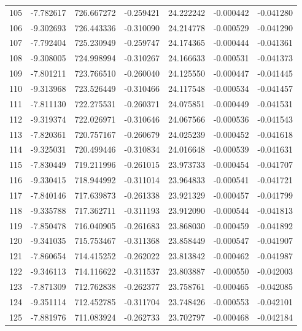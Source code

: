 \begin{tabular}{rrrrrrr}
 105 &  -7.782617 &  726.667272 & -0.259421 &  24.222242 &  -0.000442 & -0.041280 \\
 106 &  -9.302693 &  726.443336 & -0.310090 &  24.214778 &  -0.000529 & -0.041290 \\
 107 &  -7.792404 &  725.230949 & -0.259747 &  24.174365 &  -0.000444 & -0.041361 \\
 108 &  -9.308005 &  724.998994 & -0.310267 &  24.166633 &  -0.000531 & -0.041373 \\
 109 &  -7.801211 &  723.766510 & -0.260040 &  24.125550 &  -0.000447 & -0.041445 \\
 110 &  -9.313968 &  723.526449 & -0.310466 &  24.117548 &  -0.000534 & -0.041457 \\
 111 &  -7.811130 &  722.275531 & -0.260371 &  24.075851 &  -0.000449 & -0.041531 \\
 112 &  -9.319374 &  722.026971 & -0.310646 &  24.067566 &  -0.000536 & -0.041543 \\
 113 &  -7.820361 &  720.757167 & -0.260679 &  24.025239 &  -0.000452 & -0.041618 \\
 114 &  -9.325031 &  720.499446 & -0.310834 &  24.016648 &  -0.000539 & -0.041631 \\
 115 &  -7.830449 &  719.211996 & -0.261015 &  23.973733 &  -0.000454 & -0.041707 \\
 116 &  -9.330415 &  718.944992 & -0.311014 &  23.964833 &  -0.000541 & -0.041721 \\
 117 &  -7.840146 &  717.639873 & -0.261338 &  23.921329 &  -0.000457 & -0.041799 \\
 118 &  -9.335788 &  717.362711 & -0.311193 &  23.912090 &  -0.000544 & -0.041813 \\
 119 &  -7.850478 &  716.040905 & -0.261683 &  23.868030 &  -0.000459 & -0.041892 \\
 120 &  -9.341035 &  715.753467 & -0.311368 &  23.858449 &  -0.000547 & -0.041907 \\
 121 &  -7.860654 &  714.415252 & -0.262022 &  23.813842 &  -0.000462 & -0.041987 \\
 122 &  -9.346113 &  714.116622 & -0.311537 &  23.803887 &  -0.000550 & -0.042003 \\
 123 &  -7.871309 &  712.762838 & -0.262377 &  23.758761 &  -0.000465 & -0.042085 \\
 124 &  -9.351114 &  712.452785 & -0.311704 &  23.748426 &  -0.000553 & -0.042101 \\
 125 &  -7.881976 &  711.083924 & -0.262733 &  23.702797 &  -0.000468 & -0.042184 \\

\end{tabular}
